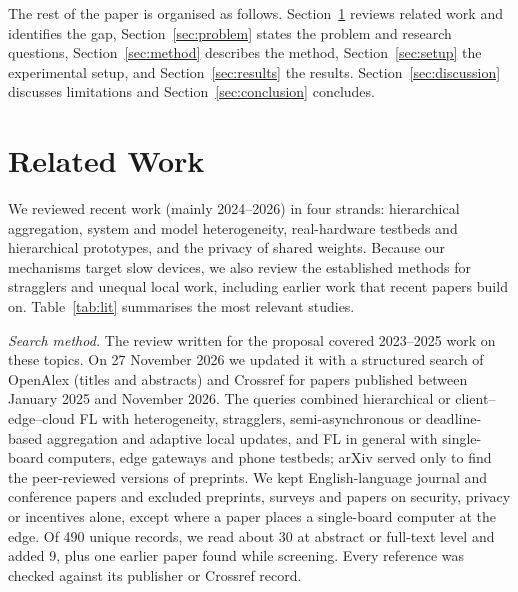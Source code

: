 \documentclass[conference]{IEEEtran}
\begin{document}
The rest of the paper is organised as follows. Section~\ref{sec:related} reviews related work and identifies the gap, Section~\ref{sec:problem} states the problem and research questions, Section~\ref{sec:method} describes the method, Section~\ref{sec:setup} the experimental setup, and Section~\ref{sec:results} the results. Section~\ref{sec:discussion} discusses limitations and Section~\ref{sec:conclusion} concludes.


\section{Related Work}
\label{sec:related}

We reviewed recent work (mainly 2024--2026) in four strands: hierarchical aggregation, system and model heterogeneity, real-hardware testbeds and hierarchical prototypes, and the privacy of shared weights. Because our mechanisms target slow devices, we also review the established methods for stragglers and unequal local work, including earlier work that recent papers build on. Table~\ref{tab:lit} summarises the most relevant studies.

\textit{Search method.} The review written for the proposal covered 2023--2025 work on these topics. On 27 November 2026 we updated it with a structured search of OpenAlex (titles and abstracts) and Crossref for papers published between January 2025 and November 2026. The queries combined hierarchical or client--edge--cloud FL with heterogeneity, stragglers, semi-asynchronous or deadline-based aggregation and adaptive local updates, and FL in general with single-board computers, edge gateways and phone testbeds; arXiv served only to find the peer-reviewed versions of preprints. We kept English-language journal and conference papers and excluded preprints, surveys and papers on security, privacy or incentives alone, except where a paper places a single-board computer at the edge. Of 490 unique records, we read about 30 at abstract or full-text level and added 9, plus one earlier paper found while screening. Every reference was checked against its publisher or Crossref record.
\end{document}
